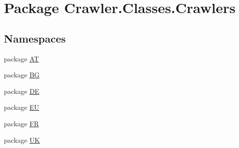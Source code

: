 \hypertarget{namespace_crawler_1_1_classes_1_1_crawlers}{\section{Package Crawler.\-Classes.\-Crawlers}
\label{namespace_crawler_1_1_classes_1_1_crawlers}
}
\subsection*{Namespaces}
\begin{DoxyCompactItemize}
\item 
package \hyperlink{namespace_crawler_1_1_classes_1_1_crawlers_1_1_a_t}{A\-T}
\item 
package \hyperlink{namespace_crawler_1_1_classes_1_1_crawlers_1_1_b_g}{B\-G}
\item 
package \hyperlink{namespace_crawler_1_1_classes_1_1_crawlers_1_1_d_e}{D\-E}
\item 
package \hyperlink{namespace_crawler_1_1_classes_1_1_crawlers_1_1_e_u}{E\-U}
\item 
package \hyperlink{namespace_crawler_1_1_classes_1_1_crawlers_1_1_f_r}{F\-R}
\item 
package \hyperlink{namespace_crawler_1_1_classes_1_1_crawlers_1_1_u_k}{U\-K}
\end{DoxyCompactItemize}
